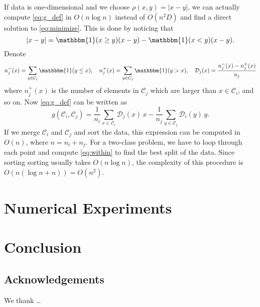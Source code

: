 \documentclass{article}
\newcommand\C{{\mathcal{C}}}
\begin{document}
If data is one-dimensional and we choose
$\rho(x,y) = |x - y|$, we can actually compute 
\eqref{eq:g_def} in $O(n \log n)$ instead of $O(n^2 D)$ and find
a direct solution to \eqref{eq:minimize}. 
This is done by noticing that
\begin{equation}
|x - y|  = \mathbbm{1}(x \ge y ) (x - y) -
\mathbbm{1}(x < y) (x - y).
\end{equation}
Denote
\begin{equation}
n_j^{-} (x) = \sum_{y \in \C_j} \mathbbm{1}(y \le x), \quad  
n_j^{+} (x) = \sum_{y \in C_j} \mathbbm{1}(y > x), \quad
\mathcal{D}_j(x) = \dfrac{n_j^-(x) - n_j^+(x)}{n_j}
\end{equation}
where $n_j^+(x)$ is the number of elements in $\C_j$ which are larger
than $x \in \C_i$, and so on.
Now \eqref{eq:g_def} can be written as
\begin{equation}
\label{eq:g1d}
g(\C_i, \C_j) = 
\dfrac{1}{n_i} \sum_{x \in \C_i} \mathcal{D}_j(x) \, x - 
\dfrac{1}{n_j} \sum_{y \in \C_j} \mathcal{D}_i(y) \, y.
\end{equation}
If we merge $\C_i$ and $\C_j$ and sort the data, this expression 
can be computed in $O(n)$, where $n=n_i+n_j$.
For a two-class problem, we have to loop through each point
and compute \eqref{eq:within} to find the best split of the data. 
Since sorting
sorting usually takes $O(n \log n)$, the complexity of
this procedure is $O(n(\log n + n)) = O(n^2)$.

\section{Numerical Experiments}

\section{Conclusion}


\subsection*{Acknowledgements}
We thank \ldots




\end{document}
